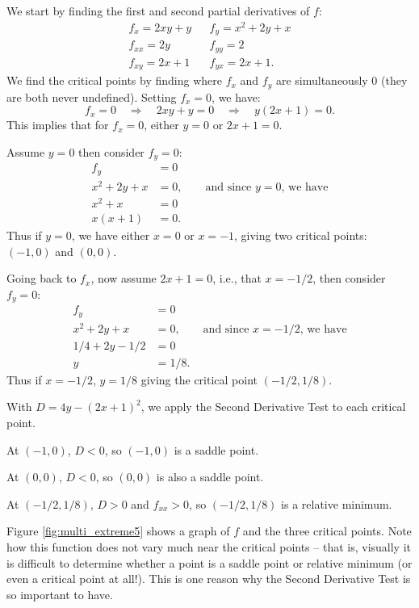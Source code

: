 {We start by finding the first and second partial derivatives of $f$:
$$\begin{array}{ccc}
f_x = 2xy+y & & f_y = x^2+2y+x \\
f_{xx} = 2y & & f_{yy} = 2\\
f_{xy} = 2x+1	 & & f_{yx} = 2x+1.
\end{array}$$
We find the critical points by finding where $f_x$ and $f_y$ are simultaneously 0 (they are both never undefined). Setting $f_x=0$, we have:
$$f_x=0 \quad \Rightarrow \quad 2xy+y=0\quad \Rightarrow \quad y(2x+1)=0.$$
This implies that for $f_x=0$, either $y=0$ or $2x+1=0$.

Assume $y=0$ then consider $f_y=0$:
\begin{align*}
f_y &= 0\\
x^2+2y+x &= 0,  \qquad \text{and since $y=0$, we have}\\
x^2+x &= 0\\
x(x+1) & = 0.
\end{align*}
Thus if $y=0$, we have either $x=0$ or $x=-1$, giving two critical points: $(-1,0)$ and $(0,0)$. 

Going back to $f_x$, now assume $2x+1=0$, i.e., that $x=-1/2$, then consider $f_y=0$:
\begin{align*}
f_y &= 0\\
x^2+2y+x &= 0,  \qquad \text{and since $x=-1/2$, we have}\\
1/4+2y-1/2 &= 0\\
y&= 1/8.
\end{align*}
Thus if $x=-1/2$, $y=1/8$ giving the critical point $(-1/2,1/8)$. 

With $D = 4y-(2x+1)^2$, we apply the Second Derivative Test to each critical point.

At $(-1,0)$, $D <0$, so $(-1,0)$ is a saddle point.

At $(0,0)$, $D<0$, so $(0,0)$ is also a saddle point.

At $(-1/2,1/8)$, $D>0$ and $f_{xx} > 0$, so $(-1/2,1/8)$ is a relative minimum.

Figure \ref{fig:multi_extreme5} shows a graph of $f$ and the three critical points. Note how this function does not vary much near the critical points -- that is, visually it is difficult to determine whether a point is a saddle point or relative minimum (or even a critical point at all!). This is one reason why the Second Derivative Test is so important to have.
}\\


